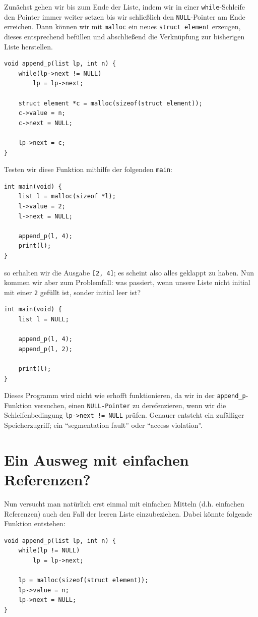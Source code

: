 \documentclass[ngerman, a4paper, 11pt]{scrartcl}
\begin{document}
Zunächst gehen wir bis zum Ende der Liste, indem wir in einer \texttt{while}-Schleife den Pointer immer weiter setzen bis wir schließlich den \texttt{NULL}-Pointer am Ende erreichen. Dann können wir mit \texttt{malloc} ein neues \texttt{struct element} erzeugen, dieses entsprechend befüllen und abschließend die Verknüpfung zur bisherigen Liste herstellen.
\begin{lstlisting}
void append_p(list lp, int n) {
	while(lp->next != NULL)
		lp = lp->next;
	
	struct element *c = malloc(sizeof(struct element));
	c->value = n;
	c->next = NULL;
	
	lp->next = c;
}
\end{lstlisting}

Testen wir diese Funktion mithilfe der folgenden \texttt{main}:
\begin{lstlisting}
int main(void) {
	list l = malloc(sizeof *l);
	l->value = 2;
	l->next = NULL;
	
	append_p(l, 4);
	print(l);
}
\end{lstlisting}
so erhalten wir die Ausgabe \texttt{[2, 4]}; es scheint also alles geklappt zu haben. 
Nun kommen wir aber zum Problemfall: was passiert, wenn unsere Liste nicht initial mit einer \texttt{2} gefüllt ist, sonder initial leer ist?
\begin{lstlisting}
int main(void) {
	list l = NULL;
	
	append_p(l, 4);
	append_p(l, 2);
	
	print(l);
}
\end{lstlisting}
Dieses Programm wird nicht wie erhofft funktionieren, da wir in der \lstinline{append_p}-Funktion versuchen, einen \texttt{NULL-Pointer} zu derefenzieren, wenn wir die Schleifenbedingung \lstinline|lp->next != NULL| prüfen. Genauer entsteht ein zufälliger Speicherzugriff; ein \enquote{segmentation fault} oder \enquote{access violation}.


\section{Ein Ausweg mit einfachen Referenzen?}

Nun versucht man natürlich erst einmal mit einfachen Mitteln (d.h. einfachen Referenzen) auch den Fall der leeren Liste einzubeziehen. Dabei könnte folgende Funktion entstehen:
\begin{lstlisting}
void append_p(list lp, int n) {
	while(lp != NULL)
		lp = lp->next;
	
	lp = malloc(sizeof(struct element));
	lp->value = n;
	lp->next = NULL;
}
\end{lstlisting}
\end{document}
